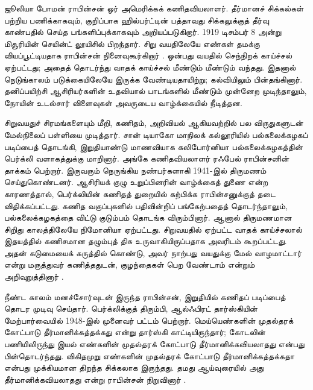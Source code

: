 \documentclass[../../../include/open-logic-section]{subfiles}
\begin{document}



ஜூலியா போமன் ராபின்சன் ஓர் அமெரிக்கக் கணிதவியலாளர். தீர்மானச்
சிக்கல்கள் பற்றிய பணிக்காகவும், குறிப்பாக ஹில்பர்ட்டின் பத்தாவது
சிக்கலுக்குத் தீர்வு காண்பதில் செய்த பங்களிப்புக்காகவும் அறியப்படுகிறார்.
1919 டிசம்பர் 8 அன்று மிசூரியின் செயின்ட் லூயிசில் பிறந்தார். சிறு
வயதிலேயே எண்கள் தமக்கு வியப்பூட்டியதாக ராபின்சன் நினைவுகூர்கிறார்
\citep[4]{Reid1986}. ஒன்பது வயதில் செந்நிறக் காய்ச்சல் ஏற்பட்டது;
அதைத் தொடர்ந்து வாதக் காய்ச்சல் மீண்டும் மீண்டும் வந்தது. இதனால்
நெடுங்காலம் படுக்கையிலேயே இருக்க வேண்டியதாயிற்று; கல்வியிலும்
பின்தங்கினார். தனிப்பயிற்சி ஆசிரியர்களின் உதவியால் பாடங்களில்
மீண்டும் முன்னேற முடிந்தாலும், நோயின் உடல்சார் விளைவுகள் அவருடைய
வாழ்க்கையில் நீடித்தன.

சிறுவயதுச் சிரமங்களையும் மீறி, கணிதம், அறிவியல் ஆகியவற்றில் பல
விருதுகளுடன் மேல்நிலைப் பள்ளியை முடித்தார். சான் டியாகோ மாநிலக்
கல்லூரியில் பல்கலைக்கழகப் படிப்பைத் தொடங்கி, இறுதியாண்டு மாணவியாக
கலிபோர்னியா பல்கலைக்கழகத்தின் பெர்க்லி வளாகத்துக்கு மாறினார். அங்கே
கணிதவியலாளர் ரஃபேல் ராபின்சனின் தாக்கம் பெற்றார். இருவரும் நெருங்கிய
நண்பர்களாகி 1941-இல் திருமணம் செய்துகொண்டனர். ஆசிரியக் குழு
உறுப்பினரின் வாழ்க்கைத் துணை என்ற காரணத்தால், பெர்க்லியின் கணிதத்
துறையில் கற்பிக்க ராபின்சனுக்குத் தடை விதிக்கப்பட்டது. கணித
வகுப்புகளில் பதிவின்றிப் பங்கேற்பதைத் தொடர்ந்தாலும், பல்கலைக்கழகத்தை
விட்டு குடும்பம் தொடங்க விரும்பினார். ஆனால் திருமணமான சிறிது காலத்திலேயே
நிமோனியா ஏற்பட்டது. சிறுவயதில் ஏற்பட்ட வாதக் காய்ச்சலால் இதயத்தில்
கணிசமான தழும்புத் திசு உருவாகியிருப்பதாக அவரிடம் கூறப்பட்டது. அதன்
கடுமையைக் கருத்தில் கொண்டு, அவர் நாற்பது வயதுக்கு மேல் வாழமாட்டார்
என்று மருத்துவர் கணித்ததுடன், குழந்தைகள் பெற வேண்டாம் என்றும் அறிவுறுத்தினார்
\citep[13]{Reid1986}.

நீண்ட காலம் மனச்சோர்வுடன் இருந்த ராபின்சன், இறுதியில் கணிதப் படிப்பைத்
தொடர முடிவு செய்தார். பெர்க்லிக்குத் திரும்பி, ஆல்ஃபிரட் தார்ஸ்கியின்
மேற்பார்வையில் 1948-இல் முனைவர் பட்டம் பெற்றார். மெய்யெண்களின் முதல்தரக்
கோட்பாடு தீர்மானிக்கத்தக்கது என்று தார்ஸ்கி காட்டியிருந்தார்; கோடலின்
பணியிலிருந்து இயல் எண்களின் முதல்தரக் கோட்பாடு தீர்மானிக்கவியலாதது
என்பது பின்தொடர்ந்தது. விகிதமுறு எண்களின் முதல்தரக் கோட்பாடு
தீர்மானிக்கத்தக்கதா என்பது முக்கியமான திறந்த சிக்கலாக இருந்தது.
தமது ஆய்வுரையில் அது தீர்மானிக்கவியலாதது என்று ராபின்சன் நிறுவினார்
\citeyearpar{Robinson1949}.
\end{document}
